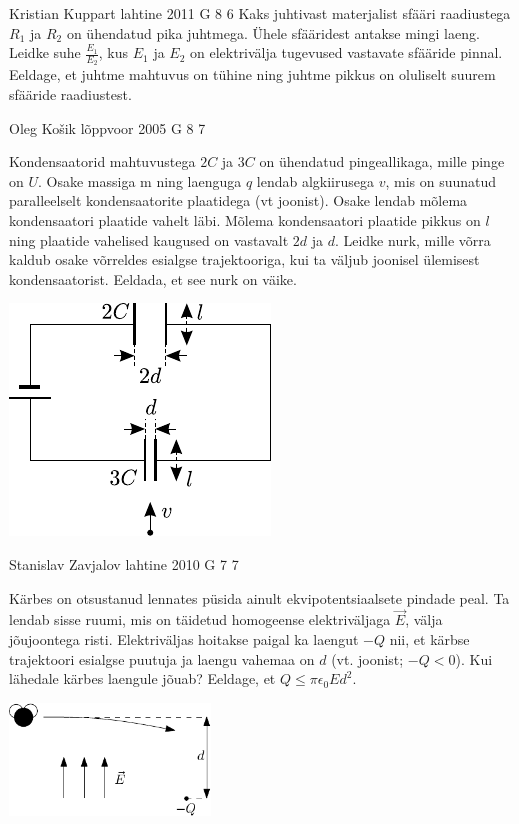 \documentclass[11pt]{article}
\begin{document}
{%
{Kristian Kuppart} %
{lahtine} %
{2011} %
{G 8} %
{6} %
{
\ifStatement
Kaks juhtivast materjalist sfääri raadiustega $R_1$ ja $R_2$ on ühendatud pika 
juhtmega. Ühele sfääridest antakse mingi laeng. Leidke suhe $\frac{E_1}{E_2}$, kus
$E_1$ ja $E_2$ on elektrivälja tugevused vastavate sfääride pinnal. Eeldage, et
juhtme mahtuvus on tühine ning juhtme pikkus on oluliselt suurem sfääride
raadiustest.
\fi
}

{Oleg Košik} %
{lõppvoor} %
{2005} %
{G 8} %
{7} %
{
\ifStatement
Kondensaatorid mahtuvustega $2C$ ja $3C$ on ühendatud pingeallikaga, mille pinge on $U$. Osake massiga m ning laenguga $q$ lendab algkiirusega $v$, mis on suunatud paralleelselt kondensaatorite plaatidega (vt joonist). Osake lendab mõlema kondensaatori plaatide vahelt läbi. Mõlema kondensaatori plaatide pikkus on $l$ ning plaatide vahelised kaugused on vastavalt $2d$ ja $d$. Leidke nurk, mille võrra kaldub osake võrreldes esialgse trajektooriga, kui ta väljub joonisel ülemisest kondensaatorist. Eeldada, et see nurk on väike.

\begin{center}
	\includegraphics[width=0.6\linewidth]{2005-v3g-08-yl}
\end{center}
\fi
}

{Stanislav Zavjalov} %
{lahtine} %
{2010} %
{G 7} %
{7} %
{
\ifStatement
Kärbes on otsustanud
lennates püsida ainult ekvipotentsiaalsete pindade peal. Ta lendab sisse ruumi,
mis on täidetud homogeense elektriväljaga $\vec{E}$, välja jõujoontega risti.
Elektriväljas hoitakse paigal ka laengut $-Q$ nii, et kärbse
trajektoori esialgse puutuja ja laengu vahemaa on $d$ (vt. joonist; $-Q < 0$).
Kui lähedale kärbes laengule jõuab? Eeldage, et $Q \le \pi\epsilon_0Ed^2$.
\begin{center}
	\includegraphics[width=0.4\textwidth]{2010-lahg-07-muha_tekst}
\end{center}
\fi
}

}
\end{document}
